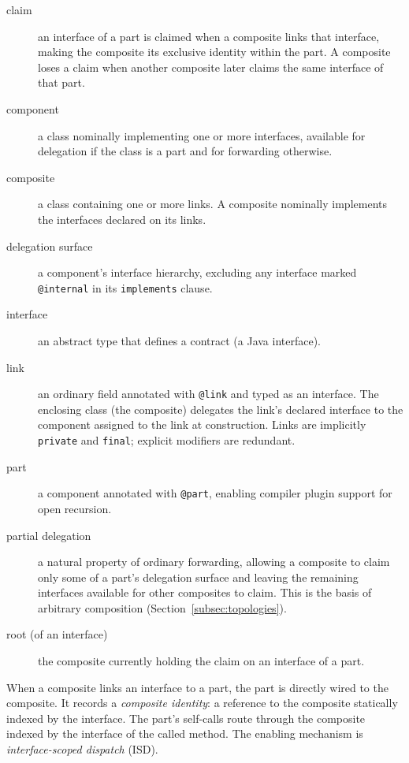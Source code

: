 \documentclass[acmsmall,nonacm]{acmart}
\theoremstyle{acmplain}
\newcommand{\code}[1]{\texttt{#1}}
\begin{document}
\begin{description}
  \item[claim] an interface of a part is claimed when a composite links that interface, making the composite its exclusive
  identity within the part. A composite loses a claim when another composite later claims the same interface of that part.

  \item[component] a class nominally implementing one or more interfaces, available for delegation if the class is a part
  and for forwarding otherwise.

  \item[composite] a class containing one or more links. A composite nominally implements the interfaces declared on its
  links.

  \item[delegation surface] a component's interface hierarchy, excluding any interface marked \code{@internal} in its \code{implements}
  clause.

  \item[interface] an abstract type that defines a contract (a Java interface).

  \item[link] an ordinary field annotated with \code{@link} and typed as an interface. The enclosing class (the composite)
  delegates the link's declared interface to the component assigned to the link at construction. Links are implicitly \code{private}
  and \code{final}; explicit modifiers are redundant.

  \item[part] a component annotated with \code{@part}, enabling compiler plugin support for open recursion.

  \item[partial delegation] a natural property of ordinary forwarding, allowing a composite to claim only some of a part's
  delegation surface and leaving the remaining interfaces available for other composites to claim. This is the basis of
  arbitrary composition (Section~\ref{subsec:topologies}).

  \item[root (of an interface)] the composite currently holding the claim on an interface of a part.
\end{description}

When a composite links an interface to a part, the part is directly wired to the composite. It records a \emph{composite
identity}: a reference to the composite statically indexed by the interface. The part's self-calls route through the composite
indexed by the interface of the called method. The enabling mechanism is \emph{interface-scoped dispatch} (ISD).
\end{document}
